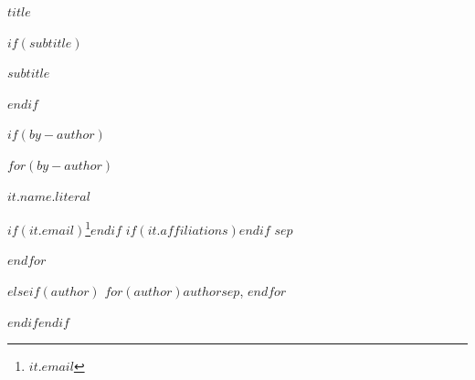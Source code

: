
\begin{titlepage}
    \thispagestyle{empty}

    \begin{center}

        \vspace*{2.5em}

        {\LARGE\bfseries $title$\par}

        $if(subtitle)$
        \vspace{0.7em}
        {\Large\itshape $subtitle$\par}
        $endif$
        \vspace{3em}
    \end{center}

    $if(by-author)$
    \begingroup
    \raggedright\setlength{\parindent}{0pt}
    \renewcommand{\thefootnote}{\fnsymbol{footnote}}%
    $for(by-author)$%
    {\large\bfseries $it.name.literal$\strut}%
    $if(it.email)$\footnote{\href{mailto:$it.email$}{$it.email$}}$endif$%
    $if(it.affiliations)$$endif$%
    $sep$\par\vspace{0.35em}$endfor$\par
    \endgroup
    \setcounter{footnote}{0}%
    $else$$if(author)$
                \noindent$for(author)$\textbf{$author$}$sep$, $endfor$\par
            $endif$$endif$


\end{titlepage}
